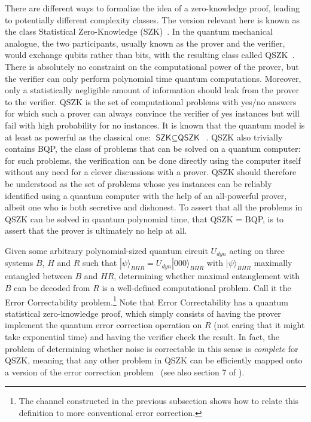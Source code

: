 \documentclass[12pt]{article}
\newcommand{\textcs}[1]{\textsf{#1}}
\begin{document}
There are different ways to formalize the idea of a zero-knowledge proof, leading to potentially different complexity classes. The version relevant here is known as the class Statistical Zero-Knowledge (\textcs{SZK})~\cite{goldwasser1989knowledge}. In the quantum mechanical analogue, the two participants, usually known as the prover and the verifier, would exchange qubits rather than bits, with the resulting class called \textcs{QSZK}~\cite{watrous2002limits}. There is absolutely no constraint on the computational power of the prover, but the verifier can only perform polynomial time quantum computations. Moreover, only a statistically negligible amount of information should leak from the prover to the verifier. \textcs{QSZK} is the set of computational problems with yes/no answers for which such a prover can always convince the verifier of yes instances but will fail with high probability for no instances. It is known that the quantum model is at least as powerful as the classical one: $\textcs{SZK} \subseteq \textcs{QSZK}$~\cite{watrous2009zero}.
%
\textcs{QSZK} also trivially contains \textcs{BQP}, the class of problems that can be solved on a quantum computer: for such problems, the verification can be done directly using the computer itself without any need for a clever discussions with a prover. \textcs{QSZK} should therefore be understood as the set of problems whose yes instances can be reliably identified using a quantum computer with the help of an all-powerful prover, albeit one who is both secretive and dishonest. To assert that all the problems in \textcs{QSZK} can be solved in quantum polynomial time, that \textcs{QSZK} = \textcs{BQP}, is to assert that the prover is ultimately no help at all.

Given some arbitrary polynomial-sized quantum circuit $U_{dyn}$ acting on three systems $B$, $H$ and $R$ such that $|\psi\rangle_{BHR} = U_{dyn} | 0 0 0 \rangle_{BHR}$ with $|\psi\rangle_{BHR}$ maximally entangled between $B$ and $HR$,
determining whether maximal entanglement with $B$ can be decoded from $R$ is a well-defined computational problem. Call it the \textcs{Error Correctability} problem.\footnote{The channel constructed in the previous subsection shows how to relate this definition to more conventional error correction.} Note that \textcs{Error Correctability} has a quantum statistical zero-knowledge proof, which simply consists of having the prover implement the quantum error correction operation on $R$ (not caring that it might take exponential time) and having the verifier check the result. In fact, the problem of determining whether noise is correctable in this sense is \emph{complete} for \textcs{QSZK}, meaning that any other problem in \textcs{QSZK} can be efficiently mapped onto a version of the error correction problem~\cite{hayden2013qszk} (see also section 7 of \cite{hayden2012two}). 
\end{document}

